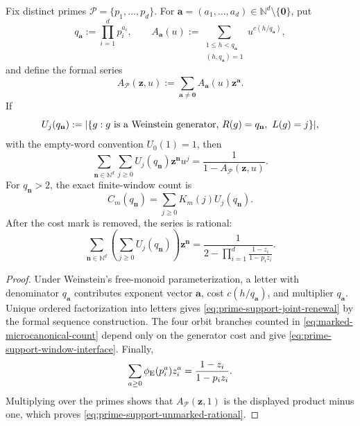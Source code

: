 \begin{proposition}
\label{prop:prime-support-interface}
Fix distinct primes \(\mathcal P=\{p_1,\ldots,p_d\}\).  For
\(\mathbf a=(a_1,\ldots,a_d)\in\mathbb N^d\setminus\{\mathbf0\}\), put
\[
 q_{\mathbf a}:=\prod_{i=1}^d p_i^{a_i},
 \qquad
 A_{\mathbf a}(u):=
 \sum_{\substack{1\le h<q_{\mathbf a}\\(h,q_{\mathbf a})=1}}
 u^{c(h/q_{\mathbf a})},
\]
and define the formal series
\[
 A_{\mathcal P}(\mathbf z,u)
 :=\sum_{\mathbf a\ne\mathbf0}
 A_{\mathbf a}(u)\mathbf z^{\mathbf a}.
\]
If
\[
 U_j(q_{\mathbf n})
 :=\lvert \{g:\text{\(g\) is a Weinstein generator, }
 R(g)=q_{\mathbf n},\ L(g)=j\} \rvert,
\]
with the empty-word convention \(U_0(1)=1\), then
\begin{equation}
 \sum_{\mathbf n\in\mathbb N^d}\sum_{j\ge0}
 U_j(q_{\mathbf n})\mathbf z^{\mathbf n}u^j
 =\frac1{1-A_{\mathcal P}(\mathbf z,u)}.
 \label{eq:prime-support-joint-renewal}
\end{equation}
For \(q_{\mathbf n}>2\), the exact finite-window count is
\begin{equation}
 C_m(q_{\mathbf n})
 =\sum_{j\ge0}K_m(j)U_j(q_{\mathbf n}).
 \label{eq:prime-support-window-interface}
\end{equation}
After the cost mark is removed, the series is rational:
\begin{equation}
 \sum_{\mathbf n\in\mathbb N^d}
 \left(\sum_{j\ge0}U_j(q_{\mathbf n})\right)\mathbf z^{\mathbf n}
 =\frac1{\displaystyle
 2-\prod_{i=1}^d\frac{1-z_i}{1-p_i z_i}}.
 \label{eq:prime-support-unmarked-rational}
\end{equation}
\end{proposition}

\begin{proof}
Under Weinstein's free-monoid parameterization, a letter with denominator
\(q_{\mathbf a}\) contributes exponent vector \(\mathbf a\), cost
\(c(h/q_{\mathbf a})\), and multiplier \(q_{\mathbf a}\).  Unique ordered
factorization into letters gives \eqref{eq:prime-support-joint-renewal} by the
formal sequence construction.  The four orbit branches counted in
\eqref{eq:marked-microcanonical-count} depend only on the generator cost and
give \eqref{eq:prime-support-window-interface}.  Finally,
\[
 \sum_{a\ge0}\phi_{\rm E}(p_i^a)z_i^a
 =\frac{1-z_i}{1-p_i z_i}.
\]
Multiplying over the primes shows that
\(A_{\mathcal P}(\mathbf z,1)\) is the displayed product minus one, which
proves \eqref{eq:prime-support-unmarked-rational}.
\end{proof}

